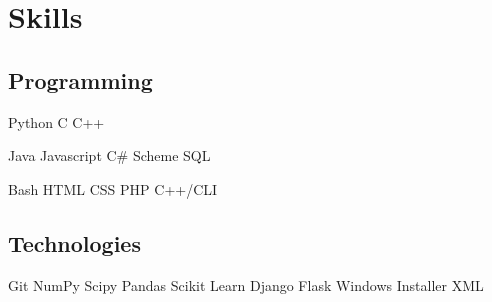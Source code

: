 \documentclass[letterpaper]{deedy-resume} %
\newcommand{\bul}{\textbullet{}}
\begin{document}
\begin{minipage}[t]{0.33\textwidth}

\section{Skills}

\subsection{Programming}


Python \bul C \bul C++


Java \bul Javascript \bul C\# \bul Scheme \bul SQL


Bash \bul HTML \bul CSS \bul PHP \bul C++/CLI

\sectionspace %

\subsection{Technologies}

Git \bul NumPy \bul Scipy \bul Pandas \bul Scikit Learn \bul Django \bul Flask
\bul Windows Installer XML


\end{minipage} %
\hfill
%
%
\end{document}

